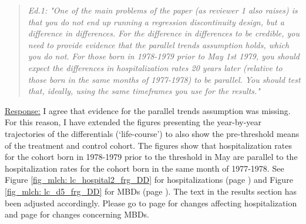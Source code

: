 {}
\begin{quote}
\textit{Ed.1: "One of the main problems of the paper (as reviewer 1 also raises) is that you do not end up running a regression discontinuity design, but a difference in differences. For the difference in differences to be credible, you need to provide evidence that the parallel trends assumption holds, which you do not. For those born in 1978-1979 prior to May 1st 1979, you should expect the differences in hospitalization rates 20 years later (relative to those born in the same months of 1977-1978) to be parallel. You should test that, ideally, using the same timeframes you use for the results."}
\end{quote}

\underline{Response:} I agree that evidence for the parallel trends assumption was missing. For this reason, I have extended the figures presenting the year-by-year trajectories of the differentials (`life-course') to also show the pre-threshold means of the treatment and control cohort. The figures show that hospitalization rates for the cohort born in 1978-1979 prior to the threshold in May are parallel to the hospitalization rates for the cohort born in the same month of 1977-1978. See Figure \ref{fig_mlch: lc_hospital2_frg_DD} for hospitalizations (page \pageref{fig_mlch: lc_hospital2_frg_DD}) and Figure \ref{fig_mlch: lc_d5_frg_DD} for MBDs (page \pageref{fig_mlch: lc_d5_frg_DD}). The text in the results section has been adjusted accordingly. Please go to page \pageref{rev_mlch: editor_parallel_trends_text} for changes affecting hospitalization and page \pageref{rev_mlch: editor_parallel_trends_text_d5} for changes concerning MBDs.






